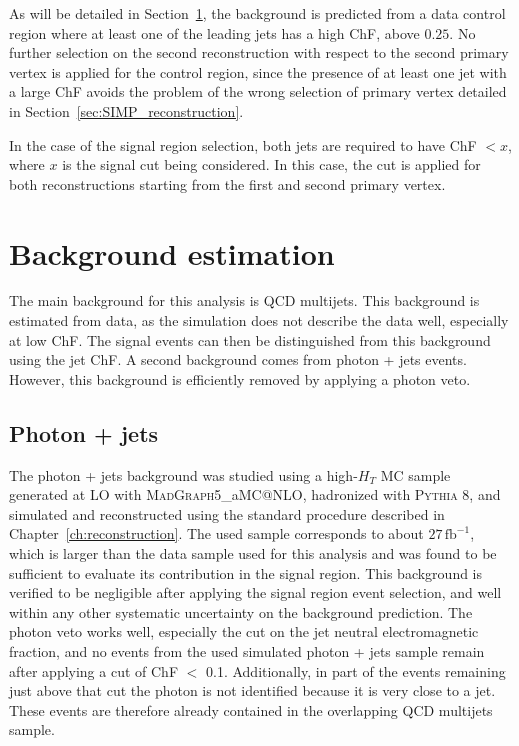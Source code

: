 As will be detailed in Section~\ref{sec:SIMP_backgrounds}, the background is predicted from a data control region where at least one of the leading jets has a high ChF, above $0.25$. No further selection on the second reconstruction with respect to the second primary vertex is applied for the control region, since the presence of at least one jet with a large ChF avoids the problem of the wrong selection of primary vertex detailed in Section~\ref{sec:SIMP_reconstruction}.

In the case of the signal region selection, both jets are required to have ChF $< x$, where $x$ is the signal cut being considered. In this case, the cut is applied for both reconstructions starting from the first and second primary vertex.

\section{Background estimation}
\label{sec:SIMP_backgrounds}

The main background for this analysis is \ac{QCD} multijets. This background is estimated from data, as the simulation does not describe the data well, especially at low ChF. The signal events can then be distinguished from this background using the jet ChF. A second background comes from photon + jets events. However, this background is efficiently removed by applying a photon veto.

\subsection{Photon + jets}

The photon + jets background was studied using a high-$H_T$ MC sample generated at \ac{LO} with \textsc{MadGraph5\_}a\textsc{MC@NLO}, hadronized with \textsc{Pythia 8}, and simulated and reconstructed using the standard procedure described in Chapter~\ref{ch:reconstruction}. The used sample corresponds to about $27\, \mathrm{fb}^{-1}$, which is larger than the data sample used for this analysis and was found to be sufficient to evaluate its contribution in the signal region. This background is verified to be negligible after applying the signal region event selection, and well within any other systematic uncertainty on the background prediction. The photon veto works well, especially the cut on the jet neutral electromagnetic fraction, and no events from the used simulated photon + jets sample remain after applying a cut of ChF $<$ 0.1. Additionally, in part of the events remaining just above that cut the photon is not identified because it is very close to a jet. These events are therefore already contained in the overlapping \ac{QCD} multijets sample.

